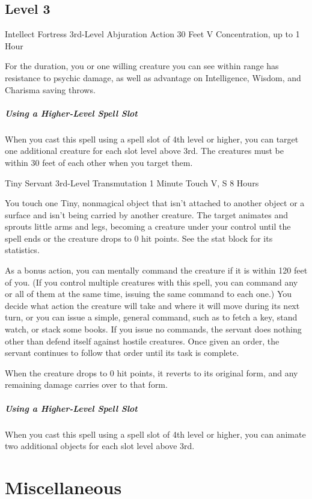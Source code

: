 \documentclass[letterpaper,openany,oneside,twocolumn]{book}
\begin{document}
\subsection*{Level 3}

\DndSpellHeader
  {Intellect Fortress}
  {3rd-Level Abjuration}
  {Action}
  {30 Feet}
  {V}
  {Concentration, up to 1 Hour}

For the duration, you or one willing creature you can see within range has resistance to psychic damage, as well as advantage on Intelligence, Wisdom, and Charisma saving throws.

\subparagraph*{Using a Higher-Level Spell Slot} When you cast this spell using a spell slot of 4th level or higher, you can target one additional creature for each slot level above 3rd. The creatures must be within 30 feet of each other when you target them.

\DndSpellHeader
  {Tiny Servant}
  {3rd-Level Transmutation}
  {1 Minute}
  {Touch}
  {V, S}
  {8 Hours}

You touch one Tiny, nonmagical object that isn't attached to another object or a surface and isn't being carried by another creature. The target animates and sprouts little arms and legs, becoming a creature under your control until the spell ends or the creature drops to 0 hit points. See the stat block for its statistics.

As a bonus action, you can mentally command the creature if it is within 120 feet of you. (If you control multiple creatures with this spell, you can command any or all of them at the same time, issuing the same command to each one.) You decide what action the creature will take and where it will move during its next turn, or you can issue a simple, general command, such as to fetch a key, stand watch, or stack some books. If you issue no commands, the servant does nothing other than defend itself against hostile creatures. Once given an order, the servant continues to follow that order until its task is complete.

When the creature drops to 0 hit points, it reverts to its original form, and any remaining damage carries over to that form.

\subparagraph*{Using a Higher-Level Spell Slot} When you cast this spell using a spell slot of 4th level or higher, you can animate two additional objects for each slot level above 3rd.

\vfill\eject
\section*{Miscellaneous}
\end{document}
